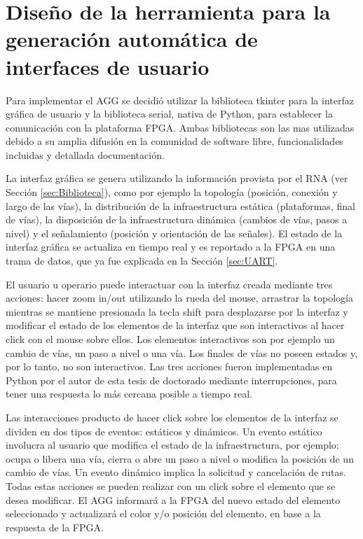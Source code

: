 	\section{Diseño de la herramienta para la generación automática de interfaces de usuario}
	\label{sec:AGG_rutas}
	
	Para implementar el AGG se decidió utilizar la biblioteca tkinter \cite{TKINTER} para la interfaz gráfica de usuario y la biblioteca serial, nativa de Python, para establecer la comunicación con la plataforma FPGA. Ambas bibliotecas son las mas utilizadas debido a su amplia difusión en la comunidad de software libre, funcionalidades incluidas y detallada documentación.
	
	La interfaz gráfica se genera utilizando la información provista por el RNA (ver Sección \ref{sec:Biblioteca}), como por ejemplo la topología (posición, conexión y largo de las vías), la distribución de la infraestructura estática (plataformas, final de vías), la disposición de la infraestructura dinámica (cambios de vías, pasos a nivel) y el señalamiento (posición y orientación de las señales). El estado de la interfaz gráfica se actualiza en tiempo real y es reportado a la FPGA en una trama de datos, que ya fue explicada en la Sección \ref{sec:UART}.
	
	El usuario u operario puede interactuar con la interfaz creada mediante tres acciones: hacer zoom in/out utilizando la rueda del mouse, arrastrar la topología mientras se mantiene presionada la tecla shift para desplazarse por la interfaz y modificar el estado de los elementos de la interfaz que son interactivos al hacer click con el mouse sobre ellos. Los elementos interactivos son por ejemplo un cambio de vías, un paso a nivel o una vía. Los finales de vías no poseen estados y, por lo tanto, no son interactivos. Las tres acciones fueron implementadas en Python por el autor de esta tesis de doctorado mediante interrupciones, para tener una respuesta lo más cercana posible a tiempo real. 
	
	Las interacciones producto de hacer click sobre los elementos de la interfaz se dividen en dos tipos de eventos: estáticos y dinámicos. Un evento estático involucra al usuario que modifica el estado de la infraestructura, por ejemplo: ocupa o libera una vía, cierra o abre un paso a nivel o modifica la posición de un cambio de vías. Un evento dinámico implica la solicitud y cancelación de rutas. Todas estas acciones se pueden realizar con un click sobre el elemento que se desea modificar. El AGG informará a la FPGA del nuevo estado del elemento seleccionado y actualizará el color y/o posición del elemento, en base a la respuesta de la FPGA. 
	
